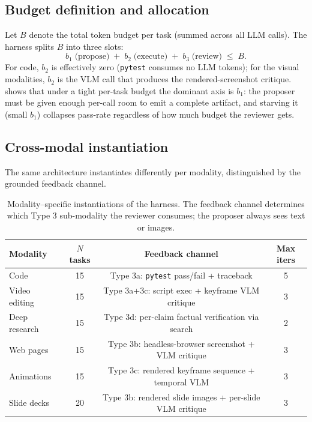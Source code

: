 \documentclass[11pt]{article}
\begin{document}
\subsection{Budget definition and allocation}
\label{sec:method-budget}

Let $B$ denote the total token budget per task (summed across all LLM calls). The harness splits $B$ into three slots:
\[
b_1 \;\text{(propose)} \;+\; b_2 \;\text{(execute)} \;+\; b_3 \;\text{(review)} \;\leq\; B.
\]
For code, $b_2$ is effectively zero (\texttt{pytest} consumes no LLM tokens); for the visual modalities, $b_2$ is the VLM call that produces the rendered-screenshot critique.  shows that under a tight per-task budget the dominant axis is $b_1$: the proposer must be given enough per-call room to emit a complete artifact, and starving it (small $b_1$) collapses pass-rate regardless of how much budget the reviewer gets.

\subsection{Cross-modal instantiation}
\label{sec:method-modality}

The same architecture instantiates differently per modality, distinguished by the grounded feedback channel.

\begin{table}[ht]
\centering
\caption{Modality--specific instantiations of the harness. The feedback channel determines which Type 3 sub-modality the reviewer consumes; the proposer always sees text or images.}
\label{tab:harness-setup}
\small
\begin{tabular}{lccc}
\toprule
Modality & $N$ tasks & Feedback channel & Max iters \\
\midrule
Code           & 15 & Type 3a: \texttt{pytest} pass/fail + traceback         & 5 \\
Video editing  & 15 & Type 3a+3c: script exec + keyframe VLM critique         & 3 \\
Deep research  & 15 & Type 3d: per-claim factual verification via search      & 2 \\
Web pages      & 15 & Type 3b: headless-browser screenshot + VLM critique     & 3 \\
Animations     & 15 & Type 3c: rendered keyframe sequence + temporal VLM      & 3 \\
Slide decks    & 20 & Type 3b: rendered slide images + per-slide VLM critique & 3 \\
\bottomrule
\end{tabular}
\end{table}
\end{document}
